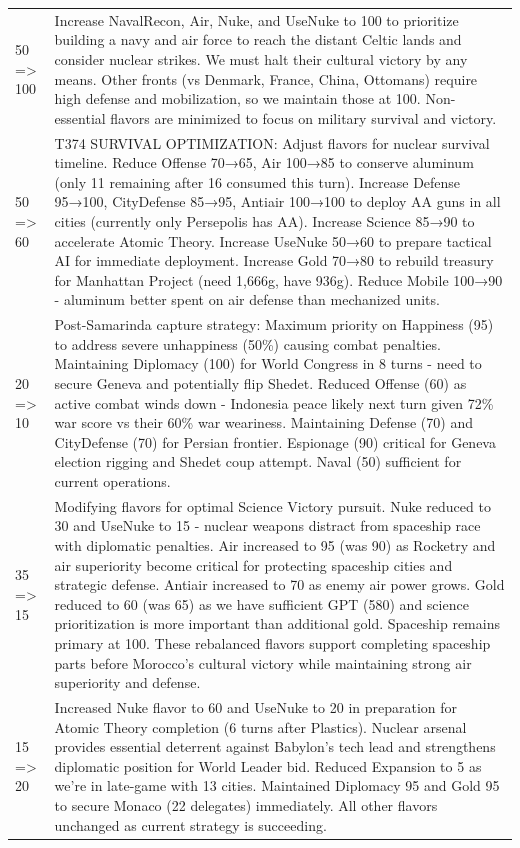 \begin{longtable}{p{}p{}}
50 => 100 & Increase NavalRecon, Air, Nuke, and UseNuke to 100 to prioritize building a navy and air force to reach the distant Celtic lands and consider nuclear strikes. We must halt their cultural victory by any means. Other fronts (vs Denmark, France, China, Ottomans) require high defense and mobilization, so we maintain those at 100. Non-essential flavors are minimized to focus on military survival and victory. \\
50 => 60 & T374 SURVIVAL OPTIMIZATION: Adjust flavors for nuclear survival timeline. Reduce Offense 70→65, Air 100→85 to conserve aluminum (only 11 remaining after 16 consumed this turn). Increase Defense 95→100, CityDefense 85→95, Antiair 100→100 to deploy AA guns in all cities (currently only Persepolis has AA). Increase Science 85→90 to accelerate Atomic Theory. Increase UseNuke 50→60 to prepare tactical AI for immediate deployment. Increase Gold 70→80 to rebuild treasury for Manhattan Project (need 1,666g, have 936g). Reduce Mobile 100→90 - aluminum better spent on air defense than mechanized units. \\
20 => 10 & Post-Samarinda capture strategy: Maximum priority on Happiness (95) to address severe unhappiness (50\%) causing combat penalties. Maintaining Diplomacy (100) for World Congress in 8 turns - need to secure Geneva and potentially flip Shedet. Reduced Offense (60) as active combat winds down - Indonesia peace likely next turn given 72\% war score vs their 60\% war weariness. Maintaining Defense (70) and CityDefense (70) for Persian frontier. Espionage (90) critical for Geneva election rigging and Shedet coup attempt. Naval (50) sufficient for current operations. \\
35 => 15 & Modifying flavors for optimal Science Victory pursuit. Nuke reduced to 30 and UseNuke to 15 - nuclear weapons distract from spaceship race with diplomatic penalties. Air increased to 95 (was 90) as Rocketry and air superiority become critical for protecting spaceship cities and strategic defense. Antiair increased to 70 as enemy air power grows. Gold reduced to 60 (was 65) as we have sufficient GPT (580) and science prioritization is more important than additional gold. Spaceship remains primary at 100. These rebalanced flavors support completing spaceship parts before Morocco's cultural victory while maintaining strong air superiority and defense. \\
15 => 20 & Increased Nuke flavor to 60 and UseNuke to 20 in preparation for Atomic Theory completion (6 turns after Plastics). Nuclear arsenal provides essential deterrent against Babylon's tech lead and strengthens diplomatic position for World Leader bid. Reduced Expansion to 5 as we're in late-game with 13 cities. Maintained Diplomacy 95 and Gold 95 to secure Monaco (22 delegates) immediately. All other flavors unchanged as current strategy is succeeding. \\

\end{longtable}
